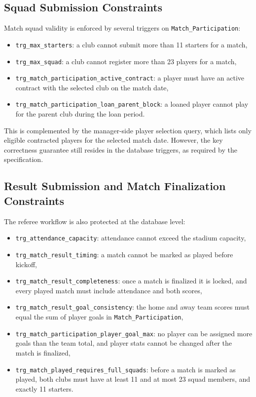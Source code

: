 \documentclass[12pt,a4paper]{article}
\begin{document}
\subsection{Squad Submission Constraints}
Match squad validity is enforced by several triggers on \texttt{Match\_Participation}:
\begin{itemize}
    \item \texttt{trg\_max\_starters}: a club cannot submit more than 11 starters for a match,
    \item \texttt{trg\_max\_squad}: a club cannot register more than 23 players for a match,
    \item \texttt{trg\_match\_participation\_active\_contract}: a player must have an active contract with the selected club on the match date,
    \item \texttt{trg\_match\_participation\_loan\_parent\_block}: a loaned player cannot play for the parent club during the loan period.
\end{itemize}

This is complemented by the manager-side player selection query, which lists only eligible contracted players for the selected match date. However, the key correctness guarantee still resides in the database triggers, as required by the specification.

\subsection{Result Submission and Match Finalization Constraints}
The referee workflow is also protected at the database level:
\begin{itemize}
    \item \texttt{trg\_attendance\_capacity}: attendance cannot exceed the stadium capacity,
    \item \texttt{trg\_match\_result\_timing}: a match cannot be marked as played before kickoff,
    \item \texttt{trg\_match\_result\_completeness}: once a match is finalized it is locked, and every played match must include attendance and both scores,
    \item \texttt{trg\_match\_result\_goal\_consistency}: the home and away team scores must equal the sum of player goals in \texttt{Match\_Participation},
    \item \texttt{trg\_match\_participation\_player\_goal\_max}: no player can be assigned more goals than the team total, and player stats cannot be changed after the match is finalized,
    \item \texttt{trg\_match\_played\_requires\_full\_squads}: before a match is marked as played, both clubs must have at least 11 and at most 23 squad members, and exactly 11 starters.
\end{itemize}
\end{document}

